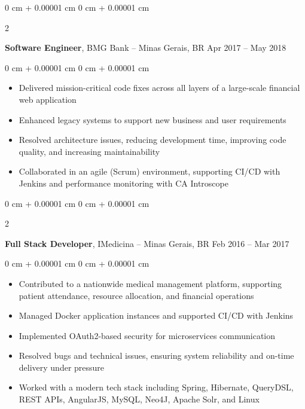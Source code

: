 \documentclass[10pt, letterpaper]{article}
\newenvironment{highlights}{
    \begin{itemize}[
        topsep=0.10 cm,
        parsep=0.10 cm,
        partopsep=0pt,
        itemsep=0pt,
        leftmargin=0 cm + 10pt
    ]
}{
    \end{itemize}
} %
\newenvironment{onecolentry}{
    \begin{adjustwidth}{
        0 cm + 0.00001 cm
    }{
        0 cm + 0.00001 cm
    }
}{
    \end{adjustwidth}
} %
\newenvironment{twocolentry}[2][]{
    \onecolentry
    \def\secondColumn{#2}
    \setcolumnwidth{\fill, 4.5 cm}
    \begin{paracol}{2}
}{
    \switchcolumn \raggedleft \secondColumn
    \end{paracol}
    \endonecolentry
} %
\begin{document}
        \vspace{0.2 cm}

        \begin{twocolentry}{
            Apr 2017 – May 2018
        }
            \textbf{Software Engineer}, BMG Bank -- Minas Gerais, BR\end{twocolentry}

        \vspace{0.10 cm}
        
        \begin{onecolentry}
            \begin{highlights}
                \item Delivered mission-critical code fixes across all layers of a large-scale financial web application
                \item Enhanced legacy systems to support new business and user requirements
                \item Resolved architecture issues, reducing development time, improving code quality, and increasing maintainability
                \item Collaborated in an agile (Scrum) environment, supporting CI/CD with Jenkins and performance monitoring with CA Introscope
            \end{highlights}
        \end{onecolentry}
        
        \vspace{0.2 cm}
        

        \begin{twocolentry}{
            Feb 2016 – Mar 2017
        }
            \textbf{Full Stack Developer}, IMedicina -- Minas Gerais, BR\end{twocolentry}

        \vspace{0.10 cm}
        
        \begin{onecolentry}
            \begin{highlights}
                \item Contributed to a nationwide medical management platform, supporting patient attendance, resource allocation, and financial operations
                \item Managed Docker application instances and supported CI/CD with Jenkins
                \item Implemented OAuth2-based security for microservices communication
                \item Resolved bugs and technical issues, ensuring system reliability and on-time delivery under pressure
                \item Worked with a modern tech stack including Spring, Hibernate, QueryDSL, REST APIs, AngularJS, MySQL, Neo4J, Apache Solr, and Linux
            \end{highlights}
        \end{onecolentry}
        
\end{document}
